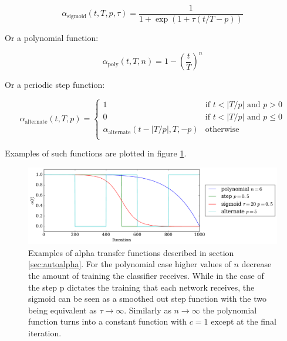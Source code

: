     \begin{equation}
      \alpha_{\text{sigmoid}}(t,T,p,\tau) = \frac{1}{1 + \exp(1 + \tau (t/T - p))}
    \end{equation}

    Or a polynomial function:

    \begin{equation}
      \alpha_{\text{poly}}(t,T,n) = 1 - \left ( \frac{t}{T} \right )^n
    \end{equation}

    Or a periodic step function:

    \begin{equation}
    \alpha_{\text{alternate}}(t,T,p) =
    \begin{cases}
      1           & \text{if } t < |T/p| \text{ and } p > 0\\
      0           & \text{if } t < |T/p| \text{ and } p \leq 0\\
      \alpha_{\text{alternate}}(t-|T/p|,T,-p)           & \text{otherwise} \\
    \end{cases}
    \end{equation}

    Examples of such functions are plotted in figure \ref{fig:alpha_functions}.

    \begin{figure}[!h]
    \centering
    \includegraphics[width =\hsize]{figures/alpha.pdf}
    \caption{Examples of alpha transfer functions described in section \ref{sec:autoalpha}.
    For the polynomial case higher values of $n$ decrease the amount of training
    the classifier receives. While in the case of the step p dictates the training
    that each network receives, the sigmoid can be seen as a smoothed out step function
    with the two being equivalent as $ \tau \rightarrow \infty$. Similarly as $n \rightarrow \infty$
    the polynomial function turns into a constant function with $c=1$ except at the final
    iteration.}
    \label{fig:alpha_functions}
    \end{figure}

